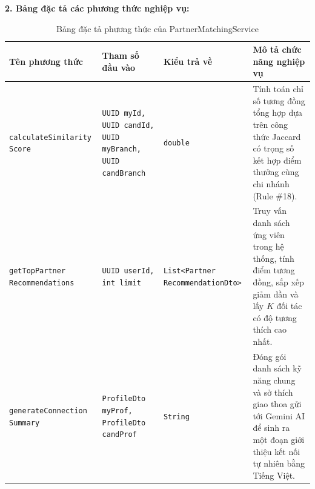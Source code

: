 \noindent\textbf{2. Bảng đặc tả các phương thức nghiệp vụ:}

\begin{table}[H]
\centering
\caption{Bảng đặc tả phương thức của PartnerMatchingService}
\label{tab:spec-matching-service}
\renewcommand{\arraystretch}{1.3}
\begin{tabular}{|p{3.8cm}|p{3.5cm}|p{2.5cm}|p{5.2cm}|}
\hline
\textbf{Tên phương thức} & \textbf{Tham số đầu vào} & \textbf{Kiểu trả về} & \textbf{Mô tả chức năng nghiệp vụ} \\
\hline
\texttt{calculateSimilarity Score} & \texttt{UUID myId, UUID candId, UUID myBranch, UUID candBranch} & \texttt{double} & Tính toán chỉ số tương đồng tổng hợp dựa trên công thức Jaccard có trọng số kết hợp điểm thưởng cùng chi nhánh (Rule \#18). \\
\hline
\texttt{getTopPartner Recommendations} & \texttt{UUID userId, int limit} & \texttt{List<Partner RecommendationDto>} & Truy vấn danh sách ứng viên trong hệ thống, tính điểm tương đồng, sắp xếp giảm dần và lấy $K$ đối tác có độ tương thích cao nhất. \\
\hline
\texttt{generateConnection Summary} & \texttt{ProfileDto myProf, ProfileDto candProf} & \texttt{String} & Đóng gói danh sách kỹ năng chung và sở thích giao thoa gửi tới Gemini AI để sinh ra một đoạn giới thiệu kết nối tự nhiên bằng Tiếng Việt. \\
\hline
\end{tabular}
\end{table}

